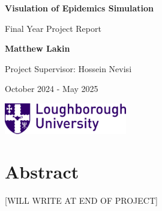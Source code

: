 \documentclass{report}
\begin{document}
\begin{titlepage}
    \begin{center}
        \vspace*{1cm}
            
        \Huge
        \textbf{Visulation of Epidemics Simulation}
            
        \vspace{0.5cm}
        \LARGE
        Final Year Project Report
            
        \vspace{1.5cm}
            
        \textbf{Matthew Lakin}
            
        \vfill
            
        Project Supervisor: Hossein Nevisi
            
        \Large
        October 2024 - May 2025\\

        \vspace{0.8cm}

        \includegraphics[width=0.4\textwidth]{Loughborough-University-Lboro-Logo.png}

        \vspace{2cm}
            
    \end{center}
\end{titlepage}

\newpage

\tableofcontents


\newpage

\chapter{Abstract}
[WILL WRITE AT END OF PROJECT]

\newpage
\end{document}
